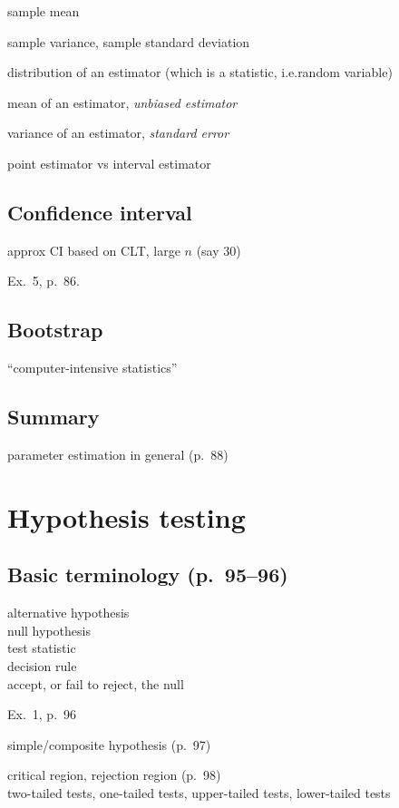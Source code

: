 \documentclass[12pt]{article}
\begin{document}
sample mean

sample variance, sample standard deviation

distribution of an estimator (which is a statistic, i.e.\@ random
variable)

mean of an estimator, \emph{unbiased estimator}

variance of an estimator, \emph{standard error}

point estimator vs interval estimator

\subsection{Confidence interval}

approx CI based on CLT, large $n$ (say 30)

\example Ex.~5, p.~86.

\subsection{Bootstrap}

``computer-intensive statistics''

\subsection{Summary}

parameter estimation in general (p.~88)

\section{Hypothesis testing}

\subsection{Basic terminology (p.~95--96)}

alternative hypothesis\\
null hypothesis\\
test statistic\\
decision rule\\
accept, or fail to reject, the null

\example Ex.~1, p.~96

simple/composite hypothesis (p.~97)

critical region, rejection region (p.~98)\\
two-tailed tests,
one-tailed tests,
upper-tailed tests, lower-tailed tests
\end{document}
